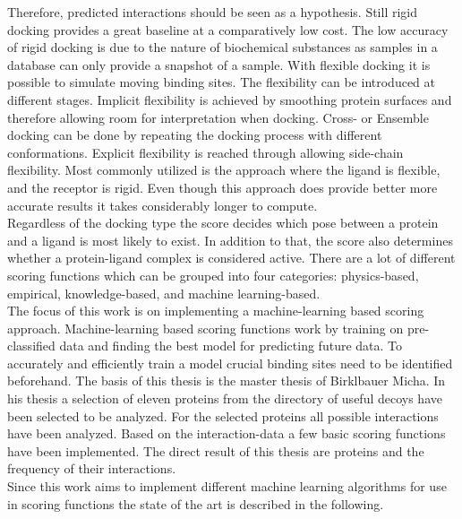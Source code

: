 Therefore, predicted interactions should be seen as a hypothesis. Still rigid docking provides a great baseline at a comparatively low cost\cite{Gimeno2019}.
The low accuracy of rigid docking is due to the nature of biochemical substances as samples in a database can only provide a snapshot of a sample.
With flexible docking it is possible to simulate moving binding sites.
The flexibility can be introduced at different stages. 
Implicit flexibility is achieved by smoothing protein surfaces and therefore allowing room for interpretation when docking.
Cross- or Ensemble docking can be done by repeating the docking process with different conformations.
Explicit flexibility is reached through allowing side-chain flexibility.
Most commonly utilized is the approach where the ligand is flexible, and the receptor is rigid.
Even though this approach does provide better more accurate results 
it takes considerably longer to compute\cite{Pagadala2017}.
\\
Regardless of the docking type the score decides which pose between a protein and a ligand is most likely to exist.
In addition to that, the score also determines whether a protein-ligand complex is considered active. 
There are a lot of different scoring functions which can be grouped into four categories:  physics-based, empirical, knowledge-based, and machine learning-based\cite{Li2019}.
\\
The focus of this work is on implementing a machine-learning based scoring approach.
Machine-learning based scoring functions work by training on pre-classified data and finding the best model for predicting future data.
To accurately and efficiently train a model crucial binding sites need to be identified beforehand.
The basis of this thesis is the master thesis of Birklbauer Micha\cite{Birklbauer2021}.
In his thesis a selection of eleven proteins from the directory of useful decoys have been selected to be analyzed.
For the selected proteins all possible interactions have been analyzed.
Based on the interaction-data a few basic scoring functions have been implemented.
The direct result of this thesis are proteins and the frequency of their interactions.
\\
Since this work aims to implement different machine learning algorithms for use in scoring functions the state of the art is described in the following. 


